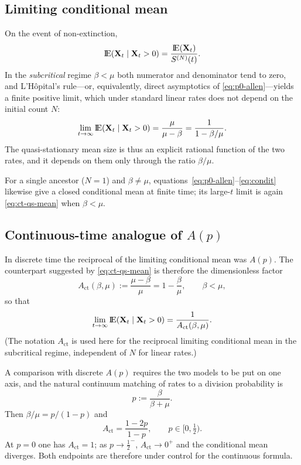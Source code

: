 \subsection{Limiting conditional mean}
\label{sec:ct-cond-mean}

On the event of non-extinction,
\begin{equation}
\label{eq:condit}
{\rm I}\!{\rm E}({{\bf X}_t} \mid {{\bf X}_t} > 0)
=
\frac{{\rm I}\!{\rm E}({{\bf X}_t})}{S^{(N)}(t)}.
\end{equation}
In the \emph{subcritical} regime $\beta<\mu$ both numerator and denominator tend to zero, and L'H\^{o}pital's rule---or, equivalently, direct asymptotics of \eqref{eq:p0-allen}---yields a finite positive limit, which under standard linear rates does not depend on the initial count $N$:
\begin{equation}
\label{eq:ct-qs-mean}
\lim_{t\to\infty}
{\rm I}\!{\rm E}({{\bf X}_t} \mid {{\bf X}_t} > 0)
=
\frac{\mu}{\mu - \beta}
=
\frac{1}{1 - \beta/\mu}.
\end{equation}
The quasi-stationary mean size is thus an explicit rational function of the two rates, and it depends on them only through the ratio $\beta/\mu$.

For a single ancestor ($N=1$) and $\beta\neq\mu$, equations~\eqref{eq:p0-allen}--\eqref{eq:condit} likewise give a closed conditional mean at finite time; its large-$t$ limit is again \eqref{eq:ct-qs-mean} when $\beta<\mu$.

\subsection{Continuous-time analogue of $A(p)$}
\label{sec:continuous-A}

In discrete time the reciprocal of the limiting conditional mean was $A(p)$. The counterpart suggested by \eqref{eq:ct-qs-mean} is therefore the dimensionless factor
\begin{equation}
\label{eq:A-cont}
A_{\mathrm{ct}}(\beta,\mu)
:=
\frac{\mu-\beta}{\mu}
=
1 - \frac{\beta}{\mu},
\qquad
\beta<\mu,
\end{equation}
so that
\[
\lim_{t\to\infty}
{\rm I}\!{\rm E}({{\bf X}_t} \mid {{\bf X}_t} > 0)
=
\frac{1}{A_{\mathrm{ct}}(\beta,\mu)}.
\]
(The notation $A_{\mathrm{ct}}$ is used here for the reciprocal limiting conditional mean in the subcritical regime, independent of $N$ for linear rates.)

A comparison with discrete $A(p)$ requires the two models to be put on one axis, and the natural continuum matching of rates to a division probability is
\begin{equation}
\label{eq:p-from-rates}
p
:=
\frac{\beta}{\beta+\mu}.
\end{equation}
Then $\beta/\mu = p/(1-p)$ and
\begin{equation}
\label{eq:A-cont-p}
A_{\mathrm{ct}}
=
\frac{1-2p}{1-p},
\qquad
p\in\bigl[0,\tfrac12\bigr).
\end{equation}
At $p=0$ one has $A_{\mathrm{ct}}=1$; as $p\to\tfrac12^{-}$, $A_{\mathrm{ct}}\to 0^{+}$ and the conditional mean diverges. Both endpoints are therefore under control for the continuous formula.

